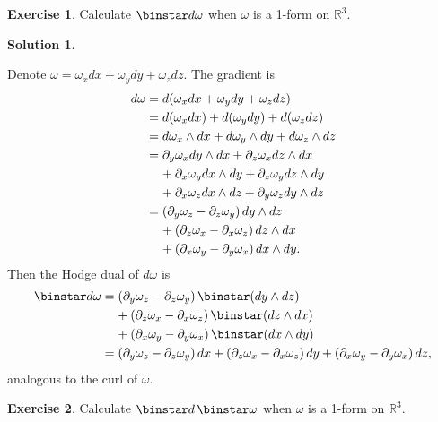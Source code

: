\documentclass[11pt, a4paper]{report}
\theoremstyle{definition}
\newtheorem{exercise}{Exercise}[part]
\newtheorem{solution}{Solution}[part]
\newenvironment{ex}{\begin{exercise}}{\end{exercise}\pagebreak[1]}
\newenvironment{sol}{\begin{solution}}{\end{solution}\pagebreak[3]}
\newcommand*{\pheq}{\ensuremath\mathrel{\phantom{=}}\negmedspace{}}
\newcommand*{\op}[1]{\ensuremath\mathop{}\mathopen{}#1}
\renewcommand*{\d}{\op{d}}
\renewcommand*{\star}{\op{\binstar}\mathord{}}
\begin{document}
\begin{ex}

Calculate $\star d\omega$ when $\omega$ is a 1-form on $\mathbb{R}^3$.

\end{ex}

\begin{sol}\label{sol:curl1form}

Denote $\omega = \omega_x dx + \omega_y dy + \omega_z dz$. The gradient is
\begin{align*}
    d\omega &= d(\omega_x dx + \omega_y dy + \omega_z dz) \\
        &= d(\omega_x dx) + d(\omega_y dy) + d(\omega_z dz) \\
        &= d\omega_x \wedge dx + d\omega_y \wedge dy + d\omega_z \wedge dz \\
        &= \partial_y \omega_x dy \wedge dx + \partial_z \omega_x dz \wedge dx \\
        &\pheq + \partial_x \omega_y dx \wedge dy + \partial_z \omega_y dz \wedge dy \\
        &\pheq + \partial_x \omega_z dx \wedge dz + \partial_y \omega_z dy \wedge dz \\
        &= (\partial_y \omega_z - \partial_z \omega_y) \d y \wedge dz \\
        &\pheq + (\partial_z \omega_x - \partial_x \omega_z) \d z \wedge dx \\
        &\pheq +(\partial_x \omega_y - \partial_y \omega_x) \d x \wedge dy.
\end{align*}
Then the Hodge dual of $d\omega$ is
\begin{align*}
    \star d\omega &= (\partial_y \omega_z - \partial_z \omega_y) \star (dy \wedge dz) \\
        &\pheq + (\partial_z \omega_x - \partial_x \omega_z) \star (dz \wedge dx) \\
        &\pheq + (\partial_x \omega_y - \partial_y \omega_x) \star (dx \wedge dy) \\
        &= \left(\partial_y \omega_z - \partial_z \omega_y\right) \d x
            + \left(\partial_z \omega_x - \partial_x \omega_z\right) \d y
            + \left(\partial_x \omega_y - \partial_y \omega_x\right) \d z,
\end{align*}
analogous to the curl of $\omega$.

\end{sol}

\begin{ex}

Calculate $\star d \star \omega$ when $\omega$ is a 1-form on $\mathbb{R}^3$.

\end{ex}
\end{document}

